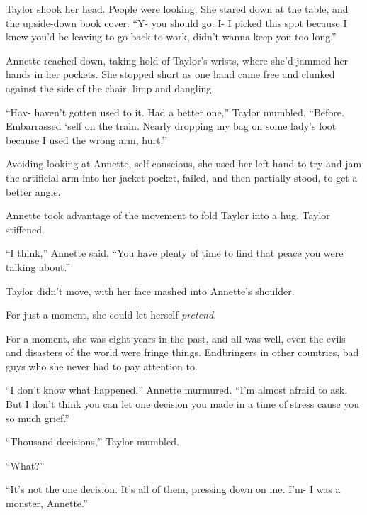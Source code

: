 Taylor shook her head.  People were looking.  She stared down at the table, and the upside-down book cover.  ``Y- you should go.  I- I picked this spot because I knew you'd be leaving to go back to work, didn't wanna keep you too long.''



Annette reached down, taking hold of Taylor's wrists, where she'd jammed her hands in her pockets.  She stopped short as one hand came free and clunked against the side of the chair, limp and dangling.



``Hav- haven't gotten used to it. Had a better one,'' Taylor mumbled.  ``Before.  Embarrassed `self on the train.  Nearly dropping my bag on some lady's foot because I used the wrong arm, hurt.''



Avoiding looking at Annette, self-conscious, she used her left hand to try and jam the artificial arm into her jacket pocket, failed, and then partially stood, to get a better angle.



Annette took advantage of the movement to fold Taylor into a hug.  Taylor stiffened.



``I think,'' Annette said, ``You have plenty of time to find that peace you were talking about.''



Taylor didn't move, with her face mashed into Annette's shoulder.



For just a moment, she could let herself \emph{pretend}.



For a moment, she was eight years in the past, and all was well, even the evils and disasters of the world were fringe things.  Endbringers in other countries, bad guys who she never had to pay attention to.



``I don't know what happened,'' Annette murmured.  ``I'm almost afraid to ask.  But I don't think you can let one decision you made in a time of stress cause you so much grief.''



``Thousand decisions,'' Taylor mumbled.



``What?''



``It's not the one decision.  It's all of them, pressing down on me.  I'm- I was a monster, Annette.''



